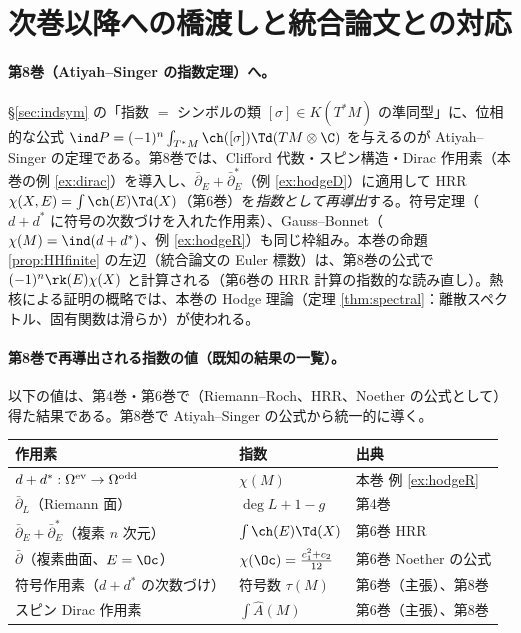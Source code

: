 \section{次巻以降への橋渡しと統合論文との対応}\label{sec:bridge}
\paragraph{第8巻（Atiyah--Singer の指数定理）へ。}\S\ref{sec:indsym} の「指数 $=$ シンボルの類 $[\sigma]\in K(T^*M)$ の準同型」に、位相的な公式 $\ind P=(-1)^n\int_{T^*M}\ch([\sigma])\Td(TM\otimes\C)$ を与えるのが Atiyah--Singer の定理である。第8巻では、Clifford 代数・スピン構造・Dirac 作用素（本巻の例 \ref{ex:dirac}）を導入し、$\bar\partial_E+\bar\partial_E^*$（例 \ref{ex:hodgeD}）に適用して HRR $\chi(X,E)=\int\ch(E)\Td(X)$（第6巻）を\emph{指数として再導出}する。符号定理（$d+d^*$ に符号の次数づけを入れた作用素）、Gauss--Bonnet（$\chi(M)=\ind(d+d^*)$、例 \ref{ex:hodgeR}）も同じ枠組み。本巻の命題 \ref{prop:HHfinite} の左辺（統合論文の Euler 標数）は、第8巻の公式で $(-1)^n\rk(E)\chi(X)$ と計算される（第6巻の HRR 計算の指数的な読み直し）。熱核による証明の概略では、本巻の Hodge 理論（定理 \ref{thm:spectral}：離散スペクトル、固有関数は滑らか）が使われる。
\paragraph{第8巻で再導出される指数の値（既知の結果の一覧）。}以下の値は、第4巻・第6巻で（Riemann--Roch、HRR、Noether の公式として）得た結果である。第8巻で Atiyah--Singer の公式から統一的に導く。
\begin{center}
\renewcommand{\arraystretch}{1.2}
\begin{tabular}{>{\raggedright\arraybackslash}p{5.4cm}>{\raggedright\arraybackslash}p{4.2cm}>{\raggedright\arraybackslash}p{4.4cm}}
\toprule
作用素 & 指数 & 出典\\
\midrule
$d+d^*:\Omega^{\rm ev}\to\Omega^{\rm odd}$ & $\chi(M)$ & 本巻 例 \ref{ex:hodgeR}\\
$\bar\partial_L$（Riemann 面） & $\deg L+1-g$ & 第4巻\\
$\bar\partial_E+\bar\partial_E^*$（複素 $n$ 次元） & $\int\ch(E)\Td(X)$ & 第6巻 HRR\\
$\bar\partial$（複素曲面、$E=\Oc$） & $\chi(\Oc)=\frac{c_1^2+c_2}{12}$ & 第6巻 Noether の公式\\
符号作用素（$d+d^*$ の次数づけ） & 符号数 $\tau(M)$ & 第6巻（主張）、第8巻\\
スピン Dirac 作用素 & $\int\widehat A(M)$ & 第6巻（主張）、第8巻\\
\bottomrule
\end{tabular}
\end{center}
